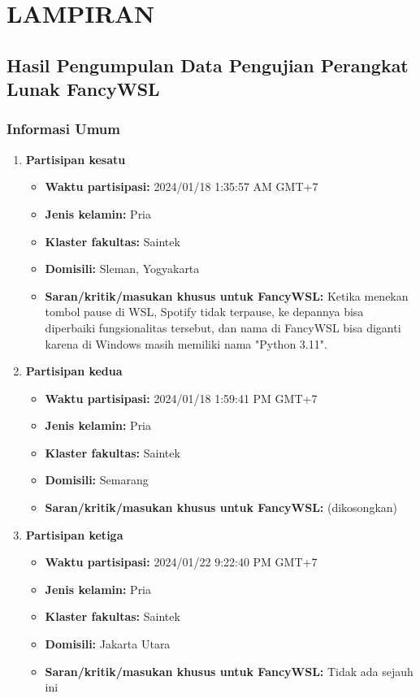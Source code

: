 \chapter*{LAMPIRAN}

\section{Hasil Pengumpulan Data Pengujian Perangkat Lunak FancyWSL}

\subsection{Informasi Umum}

\begin{enumerate}
    \item \textbf{Partisipan kesatu}
    \begin{itemize}
        \item \textbf{Waktu partisipasi:} 2024/01/18 1:35:57 AM GMT+7
        \item \textbf{Jenis kelamin:} Pria
        \item \textbf{Klaster fakultas:} Saintek
        \item \textbf{Domisili:} Sleman, Yogyakarta
        \item \textbf{Saran/kritik/masukan khusus untuk FancyWSL:} Ketika menekan tombol pause di WSL, Spotify tidak terpause, ke depannya bisa diperbaiki fungsionalitas tersebut, dan nama di FancyWSL bisa diganti karena di Windows masih memiliki nama "Python 3.11".
    \end{itemize}

    \item \textbf{Partisipan kedua}
    \begin{itemize}
        \item \textbf{Waktu partisipasi:} 2024/01/18 1:59:41 PM GMT+7
        \item \textbf{Jenis kelamin:} Pria
        \item \textbf{Klaster fakultas:} Saintek
        \item \textbf{Domisili:} Semarang
        \item \textbf{Saran/kritik/masukan khusus untuk FancyWSL:} (dikosongkan)
    \end{itemize}

    \item \textbf{Partisipan ketiga}
    \begin{itemize}
        \item \textbf{Waktu partisipasi:} 2024/01/22 9:22:40 PM GMT+7
        \item \textbf{Jenis kelamin:} Pria
        \item \textbf{Klaster fakultas:} Saintek
        \item \textbf{Domisili:} Jakarta Utara
        \item \textbf{Saran/kritik/masukan khusus untuk FancyWSL:} Tidak ada sejauh ini


\end{itemize}
\end{enumerate}
